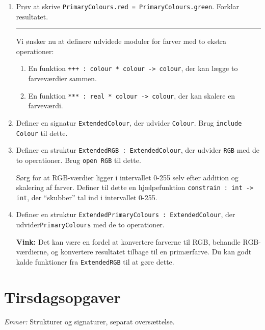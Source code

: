 \documentclass[a4paper,12pt]{article}
\begin{document}
\begin{enumerate}[{7}M1]
\item Prøv at skrive \lstinline{PrimaryColours.red = PrimaryColours.green}.
Forklar resultatet.

\vspace{2ex}

\hrule

\vspace{1ex}

Vi ønsker nu at definere udvidede moduler for farver med to ekstra operationer:

\begin{enumerate}[1.]
\item En funktion \lstinline{+++ : colour * colour -> colour}, der kan
  lægge to farveværdier sammen.

\item En funktion \lstinline{*** : real * colour -> colour}, der kan
  skalere en farveværdi.

\end{enumerate}

\item Definer en signatur \lstinline{ExtendedColour}, der udvider
  \lstinline{Colour}.  Brug \lstinline{include Colour} til dette.

\item Definer en struktur \lstinline{ExtendedRGB : ExtendedColour},
  der udvider \lstinline{RGB} med de to operationer.  Brug
  \lstinline{open RGB} til dette.

  Sørg for at RGB-værdier ligger i intervallet 0-255 selv efter
  addition og skalering af farver.  Definer til dette en
  hjælpefunktion \lstinline{constrain : int -> int}, der ``skubber''
  tal ind i intervallet 0-255.

\item Definer en struktur \lstinline{ExtendedPrimaryColours : ExtendedColour},
  der udvider\newline \lstinline{PrimaryColours} med de to operationer.

\textbf{Vink:} Det kan være en fordel at konvertere farverne til RGB,
behandle RGB-værdierne, og konvertere resultatet tilbage til en
primærfarve.  Du kan godt kalde funktioner fra \lstinline{ExtendedRGB}
til at gøre dette.

\end{enumerate}

\newpage
\section{Tirsdagsopgaver}
\label{sec:tirsdagsopgaver}
\textit{Emner:} Strukturer og signaturer, separat oversættelse.
\end{document}
